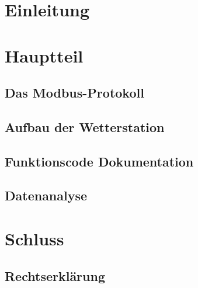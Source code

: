 \documentclass[11pt,a4paper,oneside,ngerman]{report}
\begin{document}


\tableofcontents
\listoffigures
\listoftables
\part{Einleitung}

\part{Hauptteil}
\chapter{Das Modbus-Protokoll}
\chapter{Aufbau der Wetterstation}
\chapter{Funktionscode Dokumentation}
\chapter{Datenanalyse}
\part{Schluss}
\chapter{Rechtserklärung}

 
 
\end{document}

